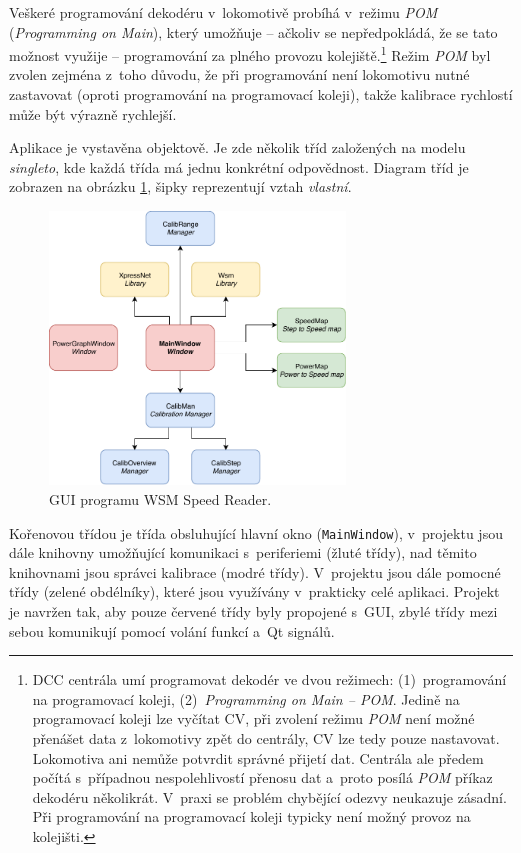 Veškeré programování dekodéru v~lokomotivě probíhá v~režimu \textit{\gls{POM}}
(\textit{Programming on Main}), který umožňuje -- ačkoliv se nepředpokládá, že
se tato možnost využije -- programování za plného provozu
kolejiště.\footnote{\gls{DCC} centrála umí programovat dekodér ve dvou režimech:
(1)~programování na programovací koleji, (2)~\textit{Programming on Main -- \gls{POM}}.
Jedině na programovací koleji lze vyčítat \gls{CV}, při zvolení režimu \textit{\gls{POM}}
není možné přenášet data z~lokomotivy zpět do centrály, \gls{CV} lze tedy pouze
nastavovat. Lokomotiva ani nemůže potvrdit správné přijetí dat. Centrála ale
předem počítá s~případnou nespolehlivostí přenosu dat a~proto posílá
\textit{\gls{POM}} příkaz dekodéru několikrát. V~praxi se problém chybějící odezvy
neukazuje zásadní. Při programování na programovací koleji typicky není možný
provoz na kolejišti.} Režim \textit{\gls{POM}} byl zvolen zejména z~toho důvodu, že
při programování není lokomotivu nutné zastavovat (oproti programování na
programovací koleji), takže kalibrace rychlostí může být výrazně rychlejší.

Aplikace je vystavěna objektově. Je zde několik tříd založených na modelu
\textit{singleto}, kde každá třída má jednu konkrétní odpovědnost. Diagram
tříd je zobrazen na obrázku \ref{fig:ac-classes}, šipky reprezentují vztah
\textit{vlastní}.

\begin{figure}[ht]
\includegraphics[width=0.7\textwidth]{data/ac_classes.pdf}
\caption{GUI programu \gls{WSM} Speed Reader.}
\label{fig:ac-classes}
\end{figure}

Kořenovou třídou je třída obsluhující hlavní okno (\texttt{MainWindow}),
v~projektu jsou dále knihovny umožňující komunikaci s~periferiemi (žluté třídy),
nad těmito knihovnami jsou správci kalibrace (modré třídy). V~projektu jsou
dále pomocné třídy (zelené obdélníky), které jsou využívány v~prakticky celé
aplikaci. Projekt je navržen tak, aby pouze červené třídy byly propojené
s~GUI, zbylé třídy mezi sebou komunikují pomocí volání funkcí a~Qt signálů.

